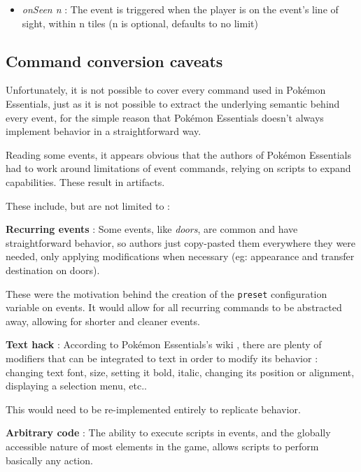 \documentclass[11pt]{article}
\begin{document}
{\begin{itemize}
\begin{itemize}
		\item \textit{onSeen n} : The event is triggered when the player is on the event's line of sight, within n tiles (n is optional, defaults to no limit)
	\end{itemize}
	
\end{itemize}







\newpage
\subsection{Command conversion caveats} %

Unfortunately, it is not possible to cover every command used in Pokémon Essentials, just as it is not possible to extract the underlying semantic behind every event, for the simple reason that Pokémon Essentials doesn't always implement behavior in a straightforward way.

Reading some events, it appears obvious that the authors of Pokémon Essentials had to work around limitations of event commands, relying on scripts to expand capabilities. These result in artifacts.

These include, but are not limited to :

\textbf{Recurring events} : Some events, like \textit{doors}, are common and have straightforward behavior, so authors just copy-pasted them everywhere they were needed, only applying modifications when necessary (eg: appearance and transfer destination on doors).

These were the motivation behind the creation of the \verb|preset| configuration variable on events. It would allow for all recurring commands to be abstracted away, allowing for shorter and cleaner events.

\textbf{Text hack} : According to Pokémon Essentials's wiki \cite{PEmessages}, there are plenty of modifiers that can be integrated to text in order to modify its behavior : changing text font, size, setting it bold, italic, changing its position or alignment, displaying a selection menu, etc..

This would need to be re-implemented entirely to replicate behavior.

\textbf{Arbitrary code} : The ability to execute scripts in events, and the globally accessible nature of most elements in the game, allows scripts to perform basically any action.

}
\end{document}
